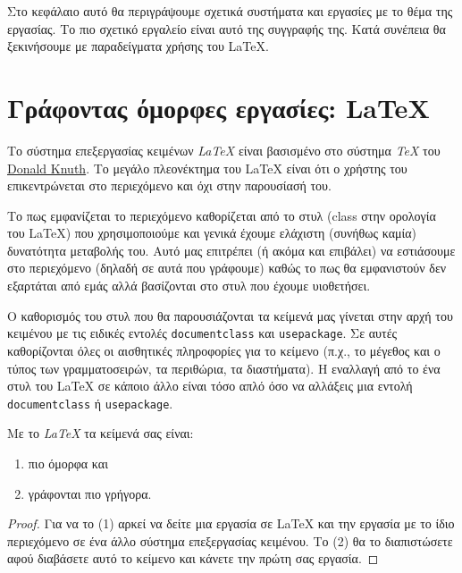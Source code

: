 


Στο κεφάλαιο αυτό θα περιγράψουμε σχετικά συστήματα και εργασίες με το θέμα της εργασίας. Το πιο σχετικό εργαλείο είναι αυτό της συγγραφής της. Κατά συνέπεια θα ξεκινήσουμε με παραδείγματα χρήσης του \LaTeX.

\section{Γράφοντας όμορφες εργασίες: \LaTeX}

Το σύστημα επεξεργασίας κειμένων \emph{\LaTeX} \cite{Lamport86} είναι βασισμένο στο σύστημα \emph{\TeX} του \href{https://en.wikipedia.org/wiki/Donald_Knuth}{Donald Knuth}. Το μεγάλο πλεονέκτημα του {\LaTeX} είναι ότι ο χρήστης του επικεντρώνεται στο περιεχόμενο και όχι στην παρουσίασή του. 

Το πως εμφανίζεται το περιεχόμενο καθορίζεται από το στυλ (class στην ορολογία του \LaTeX) που χρησιμοποιούμε και γενικά έχουμε ελάχιστη (συνήθως καμία) δυνατότητα μεταβολής του. Αυτό μας επιτρέπει (ή ακόμα και επιβάλει) να εστιάσουμε στο περιεχόμενο (δηλαδή σε αυτά που γράφουμε) καθώς το πως θα εμφανιστούν δεν εξαρτάται από εμάς αλλά βασίζονται στο στυλ που έχουμε υιοθετήσει.

Ο καθορισμός του στυλ που θα παρουσιάζονται τα κείμενά μας γίνεται στην αρχή του κειμένου με τις ειδικές εντολές \texttt{documentclass} και \texttt{usepackage}. Σε αυτές καθορίζονται όλες οι αισθητικές πληροφορίες για το κείμενο (π.χ., το μέγεθος και ο τύπος των γραμματοσειρών, τα περιθώρια, τα διαστήματα). Η εναλλαγή από το ένα στυλ του {\LaTeX} σε κάποιο άλλο είναι τόσο απλό όσο να αλλάξεις μια εντολή  \texttt{documentclass} ή \texttt{usepackage}. 


\begin{theorem}
Με το \emph{\LaTeX} \cite{Lamport86} τα κείμενά σας είναι: 
\begin{enumerate}
\item
πιο όμορφα και 
\item
γράφονται πιο γρήγορα.
\end{enumerate}
\end{theorem}

\begin{proof}
Για να το (1) αρκεί να δείτε μια εργασία σε {\LaTeX} και την εργασία με το ίδιο περιεχόμενο σε ένα άλλο σύστημα επεξεργασίας κειμένου.  Το (2) θα το διαπιστώσετε αφού διαβάσετε αυτό το κείμενο και κάνετε την πρώτη σας εργασία. 
\end{proof}

